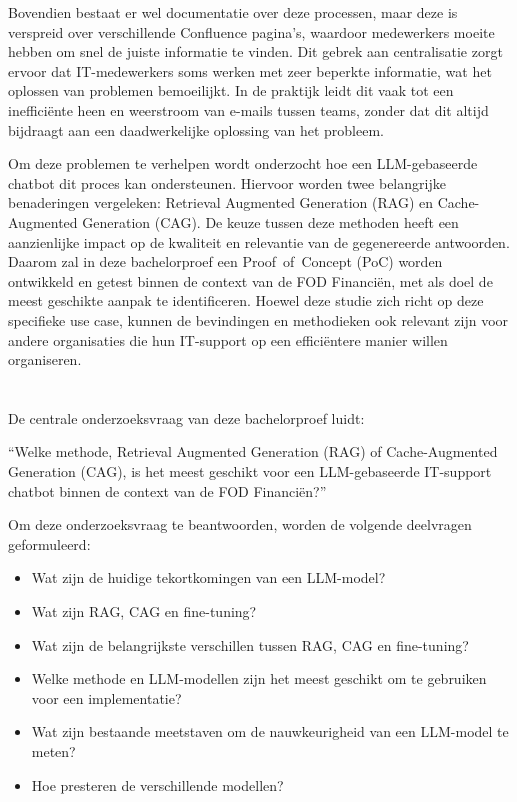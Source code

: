 Bovendien bestaat er wel documentatie over deze processen, maar deze is verspreid over verschillende Confluence pagina’s, waardoor medewerkers moeite hebben om snel de juiste informatie te vinden. Dit gebrek aan centralisatie zorgt ervoor dat IT-medewerkers soms werken met zeer beperkte informatie, wat het oplossen van problemen bemoeilijkt. In de praktijk leidt dit vaak tot een inefficiënte heen en weerstroom van e-mails tussen teams, zonder dat dit altijd bijdraagt aan een daadwerkelijke oplossing van het probleem.

Om deze problemen te verhelpen wordt onderzocht hoe een LLM-gebaseerde chatbot dit proces kan ondersteunen. Hiervoor worden twee belangrijke benaderingen vergeleken: Retrieval Augmented Generation (RAG) en Cache-Augmented Generation (CAG). De keuze tussen deze methoden heeft een aanzienlijke impact op de kwaliteit en relevantie van de gegenereerde antwoorden. Daarom zal in deze bachelorproef een Proof~of~Concept (PoC) worden ontwikkeld en getest binnen de context van de FOD Financiën, met als doel de meest geschikte aanpak te identificeren. Hoewel deze studie zich richt op deze specifieke use case, kunnen de bevindingen en methodieken ook relevant zijn voor andere organisaties die hun IT-support op een efficiëntere manier willen organiseren.

\section{}%
\label{sec:onderzoeksvraag}

De centrale onderzoeksvraag van deze bachelorproef luidt:

“{Welke methode, Retrieval Augmented Generation (RAG) of Cache-Augmented Generation (CAG), is het meest geschikt voor een LLM-gebaseerde IT-support chatbot binnen de context van de FOD Financiën?}”

Om deze onderzoeksvraag te beantwoorden, worden de volgende deelvragen geformuleerd:

\begin{itemize}
    \item Wat zijn de huidige tekortkomingen van een LLM-model?
    \item Wat zijn  RAG, CAG en fine-tuning?
    \item Wat zijn de belangrijkste verschillen tussen RAG, CAG en fine-tuning?
    \item Welke methode en LLM-modellen zijn het meest geschikt om te gebruiken voor een implementatie?
    \item Wat zijn bestaande meetstaven om de nauwkeurigheid van een LLM-model te meten?
    \item Hoe presteren de verschillende modellen?
\end{itemize}

